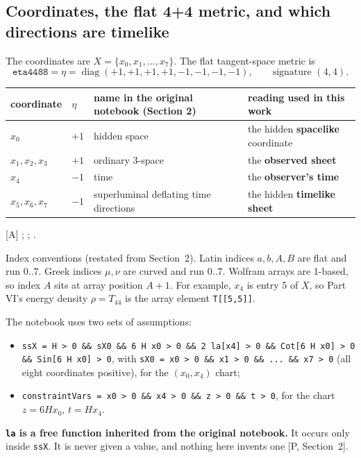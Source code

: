 \subsection{Coordinates, the flat 4+4 metric, and which directions are timelike}
\label{fnd:coords}\label{sec:2.2}

The coordinates are $X=\{x_0,x_1,\dots,x_7\}$. The flat tangent-space metric is
\begin{equation}
  \texttt{eta4488} = \eta = \operatorname{diag}(+1,+1,+1,+1,-1,-1,-1,-1),\qquad
  \text{signature }(4,4).
\end{equation}

\begin{center}
\small
\begin{tabular}{@{}llp{}p{}@{}}
\toprule
coordinate & $\eta$ & name in the original notebook (Section 2) & reading used in this work\\
\midrule
$x_0$ & $+1$ & hidden space & the hidden \textbf{spacelike} coordinate\\
$x_1,x_2,x_3$ & $+1$ & ordinary 3-space & the \textbf{observed sheet}\\
$x_4$ & $-1$ & time & the \textbf{observer's time}\\
$x_5,x_6,x_7$ & $-1$ & superluminal deflating time directions & the hidden \textbf{timelike sheet}\\
\bottomrule
\end{tabular}
\end{center}

[A] ; ;
.

Index conventions (restated from Section~2). Latin indices $a,b,A,B$ are flat and run $0..7$.
Greek indices $\mu,\nu$ are curved and run $0..7$. Wolfram arrays are 1-based, so index $A$ sits
at array position $A+1$. For example, $x_4$ is entry 5 of $X$, so Part VI's energy density
$\rho=T_{44}$ is the array element \texttt{T[[5,5]]}.

The notebook uses two sets of assumptions:
\begin{itemize}
  \item \texttt{ssX = H > 0 \&\& sX0 \&\& 6 H x0 > 0 \&\& 2 la[x4] > 0 \&\& Cot[6 H x0] > 0
        \&\& Sin[6 H x0] > 0}, with \texttt{sX0 = x0 > 0 \&\& x1 > 0 \&\& ... \&\& x7 > 0} (all
        eight coordinates positive), for the $(x_0,x_4)$ chart;
  \item \texttt{constraintVars = x0 > 0 \&\& x4 > 0 \&\& z > 0 \&\& t > 0}, for the chart
        $z = 6Hx_0$, $t = Hx_4$.
\end{itemize}
\textbf{\texttt{la} is a free function inherited from the original notebook.} It occurs only
inside \texttt{ssX}. It is never given a value, and nothing here invents one [P, Section~2].

